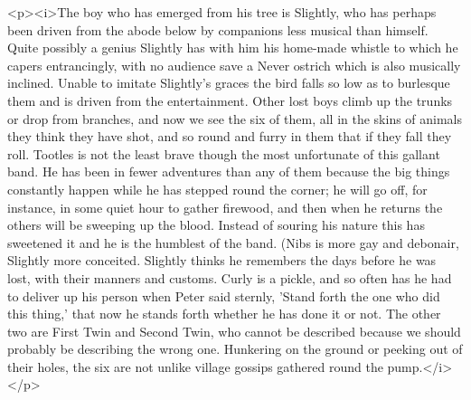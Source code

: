 \begin{stagedir}
<p><i>The boy who has emerged from his tree is Slightly, who has perhaps been driven from the abode below by companions less musical than himself.
Quite possibly a genius Slightly has with him his home-made whistle to which he capers entrancingly, with no audience save a Never ostrich which is also musically inclined.
Unable to imitate Slightly's graces the bird falls so low as to burlesque them and is driven from the entertainment.
Other lost boys climb up the trunks or drop from branches, and now we see the six of them, all in the skins of animals they think they have shot, and so round and furry in them that if they fall they roll.
Tootles is not the least brave though the most unfortunate of this gallant band.
He has been in fewer adventures than any of them because the big things constantly happen while he has stepped round the corner; he will go off, for instance, in some quiet hour to gather firewood, and then when he returns the others will be sweeping up the blood.
Instead of souring his nature this has sweetened it and he is the humblest of the band.
(Nibs is more gay and debonair, Slightly more conceited.
Slightly thinks he remembers the days before he was lost, with their manners and customs. Curly is a pickle, and so often has he had to deliver up his person when Peter said sternly, 'Stand forth the one who did this thing,' that now he stands forth whether he has done it or not.
The other two are First Twin and Second Twin, who cannot be described because we should probably be describing the wrong one.
Hunkering on the ground or peeking out of their holes, the six are not unlike village gossips gathered round the pump.</i></p>
\end{stagedir}

